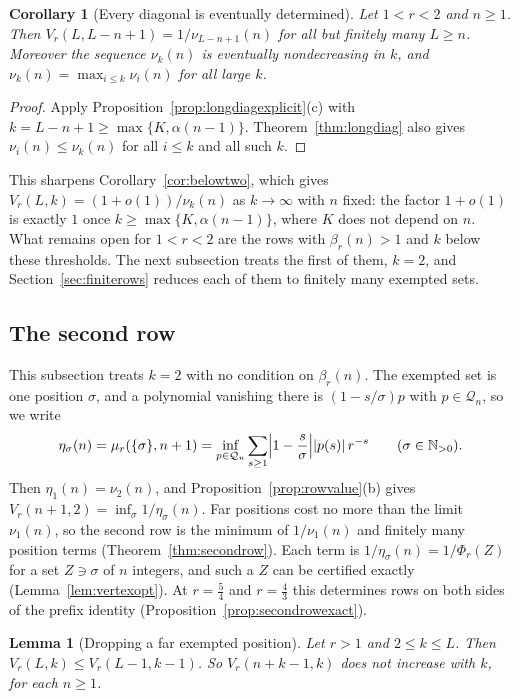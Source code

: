 \documentclass[11pt]{article}
\newtheorem{lemma}[theorem]{Lemma}
\newtheorem{corollary}[theorem]{Corollary}
\newcommand{\N}{\mathbb N}
\begin{document}
\begin{corollary}[Every diagonal is eventually determined]\label{cor:longdiagfinite}
Let $1<r<2$ and $n\ge1$.  Then $V_r(L,L-n+1)=1/\nu_{L-n+1}(n)$ for all but
finitely many $L\ge n$.  Moreover the sequence $\nu_k(n)$ is eventually
nondecreasing in $k$, and $\nu_k(n)=\max_{i\le k}\nu_i(n)$ for all large $k$.
\end{corollary}

\begin{proof}
Apply Proposition~\ref{prop:longdiagexplicit}(c) with $k=L-n+1\ge\max\{K,\alpha(n-1)\}$.
Theorem~\ref{thm:longdiag} also gives $\nu_i(n)\le\nu_k(n)$ for all
$i\le k$ and all such $k$.
\end{proof}

This sharpens Corollary~\ref{cor:belowtwo}, which gives
$V_r(L,k)=(1+o(1))/\nu_k(n)$ as $k\to\infty$ with $n$ fixed: the factor
$1+o(1)$ is exactly $1$ once $k\ge\max\{K,\alpha(n-1)\}$, where $K$ does not
depend on $n$.
What remains open for $1<r<2$ are the rows with $\beta_r(n)>1$ and $k$
below these thresholds.  The next subsection treats the first of them,
$k=2$, and Section~\ref{sec:finiterows} reduces each of them to finitely
many exempted sets.

\subsection{The second row}\label{sec:secondrow}

This subsection treats $k=2$ with no condition on $\beta_r(n)$.  The
exempted set is one position $\sigma$, and a polynomial vanishing there is
$(1-s/\sigma)p$ with $p\in\mathcal Q_n$, so we write
\[
  \eta_\sigma(n)=\mu_r(\{\sigma\},n+1)
  =\inf_{p\in\mathcal Q_n}\sum_{s\ge1}\Bigl|1-\frac s\sigma\Bigr||p(s)|\,r^{-s}
  \qquad(\sigma\in\N_{>0}).
\]
Then $\eta_1(n)=\nu_2(n)$, and Proposition~\ref{prop:rowvalue}(b) gives
$V_r(n+1,2)=\inf_\sigma1/\eta_\sigma(n)$.  Far positions cost no more than
the limit $\nu_1(n)$, so the second row is the minimum of $1/\nu_1(n)$ and
finitely many position terms (Theorem~\ref{thm:secondrow}).  Each term is
$1/\eta_\sigma(n)=1/\Phi_r(Z)$ for a set $Z\ni\sigma$ of $n$ integers, and
such a $Z$ can be certified exactly
(Lemma~\ref{lem:vertexopt}).  At $r=\frac54$ and $r=\frac43$
this determines rows on both sides of the prefix identity
(Proposition~\ref{prop:secondrowexact}).

\begin{lemma}[Dropping a far exempted position]\label{lem:rowmono}
Let $r>1$ and $2\le k\le L$.  Then $V_r(L,k)\le V_r(L-1,k-1)$.  So
$V_r(n+k-1,k)$ does not increase with $k$, for each $n\ge1$.
\end{lemma}
\end{document}
